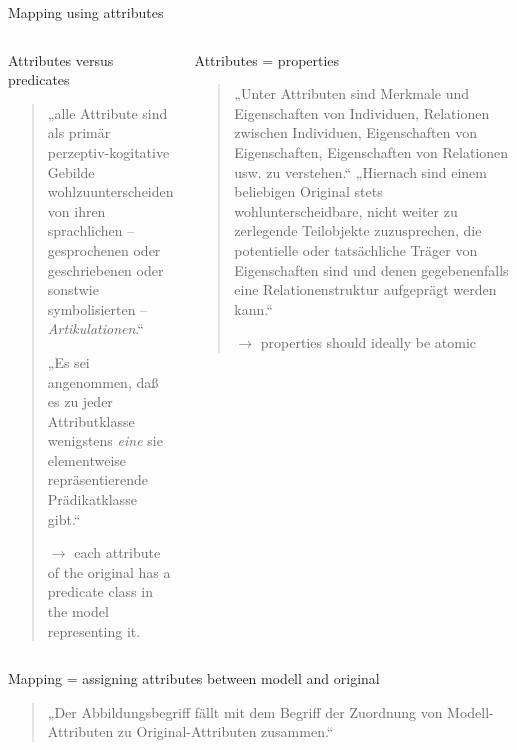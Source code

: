 \begin{frame}{Mapping using attributes}
  \begin{columns}[T,onlytextwidth]
    \begin{exampleblock}{\small Attributes versus predicates}
    \begin{quote}  \scriptsize
    „\punkti alle Attribute \lbrack{}sind\rbrack{} als primär perzeptiv-kogitative Gebilde wohlzuunterscheiden von ihren sprachlichen -- gesprochenen oder geschriebenen oder sonstwie symbolisierten -- \emph{Artikulationen}.“ \parencite[135]{stachowiak}\smallskip
    
    „Es sei angenommen, daß es zu jeder Attributklasse wenigstens \emph{eine} sie elementweise repräsentierende Prädikatklasse gibt.“ \parencite[137]{stachowiak}
    
    \alert{$\to$ each attribute of the original has a predicate class in the model representing it.}
    \end{quote}
    \end{exampleblock}

    \begin{exampleblock}{Attributes = properties}
    \begin{quote}  \scriptsize
    „Unter Attributen sind Merkmale und Eigenschaften von Individuen, Relationen zwischen Individuen, Eigenschaften von Eigenschaften, Eigenschaften von Relationen usw. zu verstehen.“ 
    „Hiernach sind einem beliebigen Original stets wohlunterscheidbare, nicht weiter zu zerlegende Teilobjekte zuzusprechen, die potentielle oder tatsächliche Träger von Eigenschaften sind und denen gegebenenfalls eine Relationenstruktur aufgeprägt werden kann.“ \parencite[134]{stachowiak}
    
    \alert{$\to$ properties should ideally be atomic}
    \end{quote}
    \end{exampleblock}
  \end{columns}
    \begin{block}{Mapping = assigning attributes between modell and original}
        \begin{quote}\scriptsize
            „Der Abbildungsbegriff fällt mit dem Begriff der Zuordnung von Modell-Attributen zu Original-Attributen zusammen.“ \parencite[132]{stachowiak}
        \end{quote}
    \end{block}
\end{frame}

